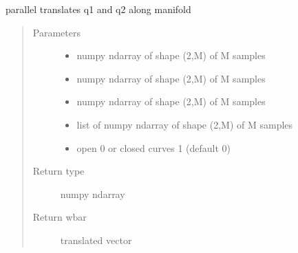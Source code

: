 \documentclass[letterpaper,10pt,english]{sphinxmanual}
\begin{document}
\begin{fulllineitems}
\label{\detokenize{curve_functions:curve_functions.parallel_translate}}
parallel translates q1 and q2 along manifold
\begin{quote}\begin{description}
\item[{Parameters}] \leavevmode\begin{itemize}
\item {} 
 \textendash{} numpy ndarray of shape (2,M) of M samples

\item {} 
 \textendash{} numpy ndarray of shape (2,M) of M samples

\item {} 
 \textendash{} numpy ndarray of shape (2,M) of M samples

\item {} 
 \textendash{} list of numpy ndarray of shape (2,M) of M samples

\item {} 
 \textendash{} open 0 or closed curves 1 (default 0)

\end{itemize}

\item[{Return type}] \leavevmode
numpy ndarray

\item[{Return wbar}] \leavevmode
translated vector

\end{description}\end{quote}

\end{fulllineitems}

\end{document}

